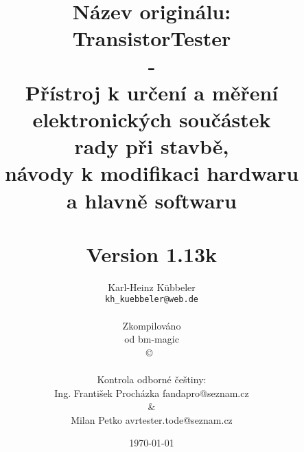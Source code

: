 \documentclass[pdftex,12pt,a4paper,oneside,english]{report}
\begin{document}
\begin{figure}[t]
\end{figure}

\newcommand\electricC {
\hspace{-10pt}
\begin{circuitikz}
\draw (0,0) to[capacitor] (0:1);
\end{circuitikz}
\hspace{-6pt}
}
\newcommand\electricR {
\hspace{-10pt}
\begin{circuitikz}
\draw (0,0) to[european resistor] (0:1);
\end{circuitikz}
\hspace{-6pt}
}
\newcommand\electricL {
\hspace{-10pt}
\begin{circuitikz}
\draw (0,0) 
 to[american inductor] (-1,0) 
;\end{circuitikz}
\hspace{-6pt}
}
\newcommand\electricDAK {
\begin{circuitikz}
\draw (0,0) to[full diode] (0:1);
\end{circuitikz}
}
\newcommand\electricDKA {
\begin{circuitikz}
\draw (0,0) to[full diode] (180:1);
\end{circuitikz}
}
\title{Název originálu:\\
TransistorTester
\\-
\\Přístroj k určení a měření elektronických součástek \\
rady při stavbě,\\
návody k modifikaci hardwaru\\ 
a hlavně softwaru\\
~\\
Version 1.13k \\
}
\author{Karl-Heinz Kübbeler\\
\texttt{kh\_kuebbeler@web.de}
\\
\\
\vspace{-0.3cm}
{\scriptsize Zkompilováno}\\
{\scriptsize od bm-magic}\\
\copyright~\\
~\\
\vspace{-0.3cm}
{\scriptsize Kontrola odborné češtiny:}\\
{\scriptsize Ing. František Procházka \hspace*{0.2cm}fandapro@seznam.cz}\\
\vspace{-0.3cm}
{\scriptsize \&}\\
{\scriptsize Milan Petko \hspace*{0.2cm} avrtester.tode@seznam.cz}
}
\date{\today}
\maketitle
\tableofcontents
\end{document}

